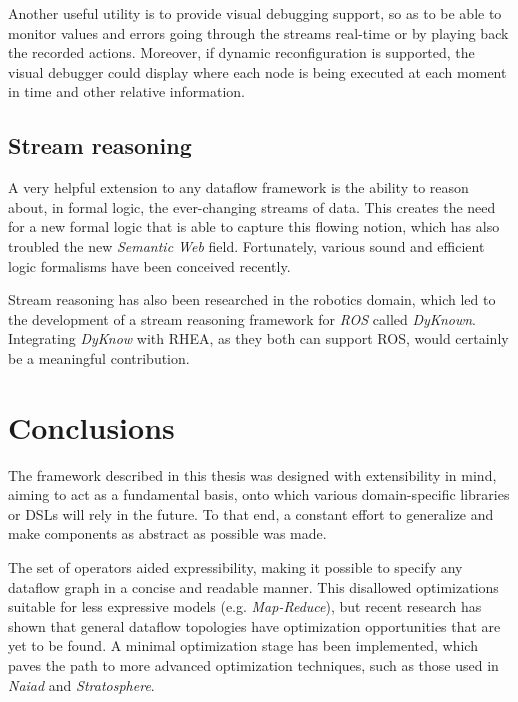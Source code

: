 \documentclass[sigplan,review,anonymous]{acmart}\settopmatter{printfolios=true,printacmref=false}
\begin{document}
Another useful utility is to provide visual debugging support, so as to be able to monitor values and errors going through the streams real-time or by playing back the recorded actions. Moreover, if dynamic reconfiguration is supported, the visual debugger could display where each node is being executed at each moment in time and other relative information.

\subsection{Stream reasoning}

A very helpful extension to any dataflow framework is the ability to reason about, in formal logic, the ever-changing streams of data. This creates the need for a new formal logic that is able to capture this flowing notion, which has also troubled the new \textit{Semantic Web} field\cite{streaming_world}. Fortunately, various sound and efficient logic formalisms have been conceived recently\cite{pdt_logic,asp}.

Stream reasoning has also been researched in the robotics domain\cite{robot_reasoning}, which led to the development of a stream reasoning framework for \textit{ROS} called \textit{DyKnown}\cite{stream_reasoning}. Integrating \textit{DyKnow} with \textsc{RHEA}, as they both can support ROS, would certainly be a meaningful contribution.

\section{Conclusions} \label{sec:conclusions}

The framework described in this thesis was designed with extensibility in mind, aiming to act as a fundamental basis, onto which various domain-specific libraries or DSLs will rely in the future. To that end, a constant effort to generalize and make components as abstract as possible was made.

The set of operators aided expressibility, making it possible to specify any dataflow graph in a concise and readable manner. This disallowed optimizations suitable for less expressive models (e.g. \textit{Map-Reduce}), but recent research has shown that general dataflow topologies have optimization opportunities that are yet to be found\cite{blackbox}. A minimal optimization stage has been implemented, which paves the path to more advanced optimization techniques, such as those used in \textit{Naiad}\cite{naiad} and \textit{Stratosphere}\cite{static_analysis}.
\end{document}
